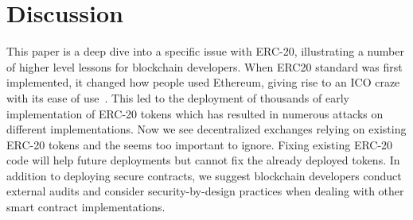 \section{Discussion}
This paper is a deep dive into a specific issue with ERC-20, illustrating a number of higher level lessons for blockchain developers. When ERC20 standard was first implemented, it changed how people used Ethereum, giving rise to an ICO craze with its ease of use~\cite{fenu2018ico}. This led to the deployment of thousands of early implementation of ERC-20 tokens which has resulted in numerous attacks on different implementations. Now we see decentralized exchanges relying on existing ERC-20 tokens and the \mwa seems too important to ignore. Fixing existing ERC-20 code will help future deployments but cannot fix the already deployed tokens. In addition to deploying secure contracts, we suggest blockchain developers conduct external audits and consider security-by-design practices when dealing with other smart contract implementations.